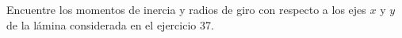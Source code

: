 \item Encuentre los momentos de inercia y radios de giro con respecto a los ejes $x$ y $y$ de la lámina considerada en el ejercicio 37.
